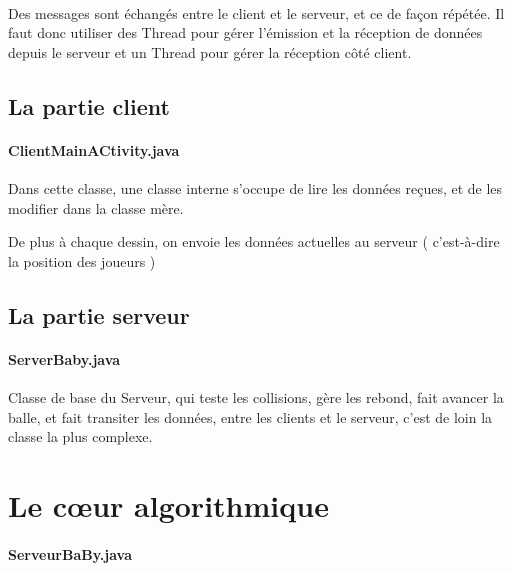 \documentclass[a4paper,12pt]{report}
\begin{document}
\paragraph{}

Des messages sont échangés entre le client et le serveur, et ce de façon répétée. Il faut donc utiliser des Thread pour gérer l'émission et la réception de données depuis le serveur et un Thread pour gérer la réception côté client. 

\subsection{La partie client}

\paragraph{ClientMainACtivity.java}

Dans cette classe, une classe interne s'occupe de lire les données reçues, et de les modifier dans la classe mère.

De plus à chaque dessin, on envoie les données actuelles au serveur ( c'est-à-dire la position des joueurs )

\subsection{La partie serveur}

\paragraph{ServerBaby.java}

Classe de base du Serveur, qui teste les collisions, gère les rebond, fait avancer la balle, et fait transiter les données, entre les clients et le serveur, c'est de loin la classe la plus complexe.




\section{Le c\oe{}ur algorithmique}

\paragraph{ServeurBaBy.java}
\end{document}
